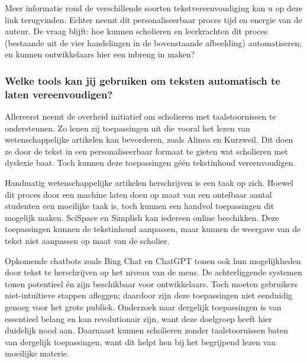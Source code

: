 \documentclass[a4paper,9pt,twoside]{report}
\begin{document}
\begin{figure}[H]
\end{figure}

\noindent Meer informatie rond de verschillende soorten tekstvereenvoudiging kan u op deze link terugvinden. Echter neemt dit personaliseerbaar proces tijd en energie van de auteur. De vraag blijft: hoe kunnen scholieren en leerkrachten dit proces (bestaande uit de vier handelingen in de bovenstaande afbeelding) automatiseren; en kunnen ontwikkelaars hier een inbreng in maken?

\subsubsection{Welke tools kan jij gebruiken om teksten automatisch te laten vereenvoudigen?}

\noindent Allereerst neemt de overheid initiatief om scholieren met taalstoornissen te ondersteunen. Zo lenen zij toepassingen uit die vooral het lezen van wetenschappelijke artikelen kan bevorderen, zoals Alinea en Kurzweil. Dit doen ze door de tekst in een personaliseerbaar formaat te gieten wat scholieren met dyslexie baat. Toch kunnen deze toepassingen géén tekstinhoud vereenvoudigen.

\medspace

\noindent Handmatig wetenschappelijke artikelen herschrijven is een taak op zich. Hoewel dit proces door een machine laten doen op maat van een ontelbaar aantal studenten een moeilijke taak is, toch kunnen een handvol toepassingen dit mogelijk maken. SciSpace en Simplish kan iedereen online beschikken. Deze toepassingen kunnen de tekstinhoud aanpassen, maar kunnen de weergave van de tekst niet aanpassen op maat van de scholier.

\medspace

\noindent Opkomende chatbots zoals Bing Chat en ChatGPT tonen ook hun mogelijkheden door tekst te herschrijven op het niveau van de mens. De achterliggende systemen tonen potentieel én zijn beschikbaar voor ontwikkelaars. Toch moeten gebruikers niet-intuïtieve stappen afleggen; daardoor zijn deze toepassingen niet eenduidig genoeg voor het grote publiek. Onderzoek naar dergelijk toepassingen is van essentieel belang en kan revolutionair zijn, want deze doelgroep heeft hier duidelijk nood aan. Daarnaast kunnen scholieren zonder taalstoornissen baten van dergelijk toepassingen, want dit helpt hen bij het begrijpend lezen van moeilijke materie.
\end{document}

